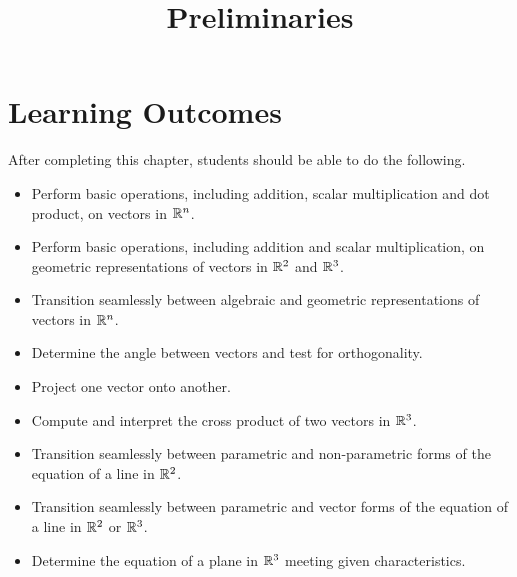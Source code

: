 \documentclass{ximera}
\title{Preliminaries}
\begin{document}
\begin{abstract}
\end{abstract}
 
\maketitle
 
\section*{Learning Outcomes}
After completing this chapter, students should be able to do the following.
 
\begin{itemize}
    \item Perform basic operations, including addition, scalar multiplication and dot product, on vectors in $\mathbb{R}^n$.
    
    \item Perform basic operations, including addition and scalar multiplication, on geometric representations of vectors in $\mathbb{R}^2$ and $\mathbb{R}^3$.
    
    \item Transition seamlessly between algebraic and geometric representations of vectors in $\mathbb{R}^n$.
    
   \item  Determine the angle between vectors and test for orthogonality.

   \item  Project one vector onto another.

   \item  Compute and interpret the cross product of two vectors in $\mathbb{R}^3$. 

   \item Transition seamlessly between parametric and non-parametric forms of the equation of a line in $\mathbb{R}^2$.
   
   \item Transition seamlessly between parametric and vector forms of the equation of a line in $\mathbb{R}^2$ or $\mathbb{R}^3$.

   \item  Determine the equation of a plane in $\mathbb{R}^3$ meeting given characteristics.
   
 \end{itemize}
 
\end{document}
